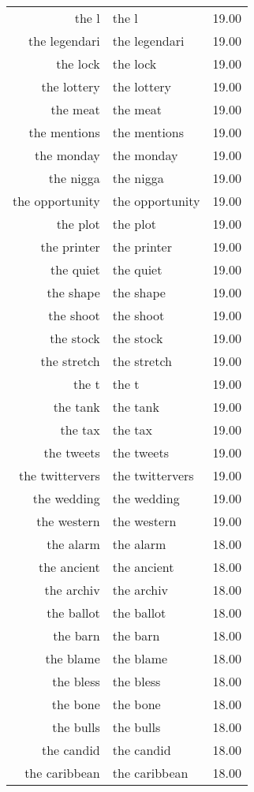 \begin{table}[ht]
\begin{tabular}{rlr}
  the l & the l & 19.00 \\ 
  the legendari & the legendari & 19.00 \\ 
  the lock & the lock & 19.00 \\ 
  the lottery & the lottery & 19.00 \\ 
  the meat & the meat & 19.00 \\ 
  the mentions & the mentions & 19.00 \\ 
  the monday & the monday & 19.00 \\ 
  the nigga & the nigga & 19.00 \\ 
  the opportunity & the opportunity & 19.00 \\ 
  the plot & the plot & 19.00 \\ 
  the printer & the printer & 19.00 \\ 
  the quiet & the quiet & 19.00 \\ 
  the shape & the shape & 19.00 \\ 
  the shoot & the shoot & 19.00 \\ 
  the stock & the stock & 19.00 \\ 
  the stretch & the stretch & 19.00 \\ 
  the t & the t & 19.00 \\ 
  the tank & the tank & 19.00 \\ 
  the tax & the tax & 19.00 \\ 
  the tweets & the tweets & 19.00 \\ 
  the twittervers & the twittervers & 19.00 \\ 
  the wedding & the wedding & 19.00 \\ 
  the western & the western & 19.00 \\ 
  the alarm & the alarm & 18.00 \\ 
  the ancient & the ancient & 18.00 \\ 
  the archiv & the archiv & 18.00 \\ 
  the ballot & the ballot & 18.00 \\ 
  the barn & the barn & 18.00 \\ 
  the blame & the blame & 18.00 \\ 
  the bless & the bless & 18.00 \\ 
  the bone & the bone & 18.00 \\ 
  the bulls & the bulls & 18.00 \\ 
  the candid & the candid & 18.00 \\ 
  the caribbean & the caribbean & 18.00 \\ 

\end{tabular}
\end{table}
